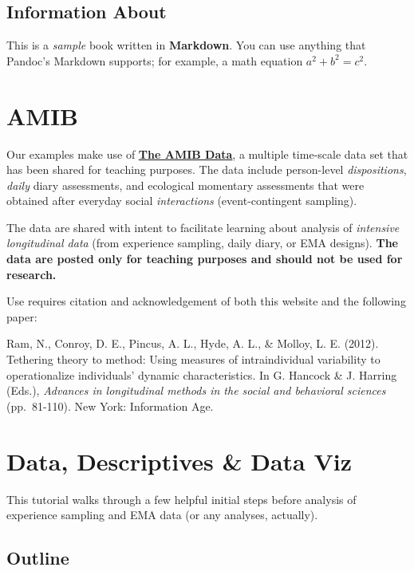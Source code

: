 \documentclass[
]{book}
\theoremstyle{definition}
\theoremstyle{definition}
\theoremstyle{definition}
\theoremstyle{definition}
\theoremstyle{remark}
\begin{document}
\section{Information About}\label{information-about}

This is a \emph{sample} book written in \textbf{Markdown}. You can use anything
that Pandoc's Markdown supports; for example, a math equation
\(a^2 + b^2 = c^2\).

\chapter{AMIB}\label{amib}

Our examples make use of \href{https://thechangelab.stanford.edu/collaborations/the-amib-data/}{\textbf{The AMIB Data}}, a multiple time-scale data set that has been shared for teaching purposes.
The data include person-level \emph{dispositions}, \emph{daily} diary assessments, and ecological momentary assessments that were obtained after everyday social \emph{interactions} (event-contingent sampling).

The data are shared with intent to facilitate learning about analysis of \emph{intensive longitudinal data} (from experience sampling, daily diary, or EMA designs).
\textbf{The data are posted only for teaching purposes and should not be used for research.}

Use requires citation and acknowledgement of both this website and the following paper:

Ram, N., Conroy, D. E., Pincus, A. L., Hyde, A. L., \& Molloy, L. E. (2012). Tethering theory to method: Using measures of intraindividual variability to operationalize individuals' dynamic characteristics. In G. Hancock \& J. Harring (Eds.), \emph{Advances in longitudinal methods in the social and behavioral sciences} (pp.~81-110). New York: Information Age.\\

\chapter{Data, Descriptives \& Data Viz}\label{data-descriptives-dataviz}

This tutorial walks through a few helpful initial steps before analysis of experience sampling and EMA data (or any analyses, actually).

\section{Outline}\label{outline}
\end{document}
